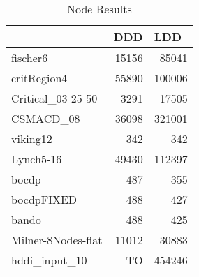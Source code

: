 \begin{table}

    \begin{tabular}{|l|r|r|}
    \hline
                       & \multicolumn{1}{l|}{DDD}   & \multicolumn{1}{l|}{LDD}    \\ \hline
    fischer6           & 15156 & 85041  \\
    critRegion4        & 55890 & 100006 \\
    Critical\_03-25-50 & 3291  & 17505  \\
    CSMACD\_08         & 36098 & 321001 \\
    viking12           & 342   & 342    \\
    Lynch5-16          & 49430 & 112397 \\
    bocdp              & 487   & 355    \\
    bocdpFIXED         & 488   & 427    \\
    bando              & 488   & 425    \\
    Milner-8Nodes-flat & 11012 & 30883  \\
    hddi\_input\_10    & TO    & 454246 \\ \hline
    \end{tabular}
\caption{Node Results}
\label{tab:node_results}
\end{table}

